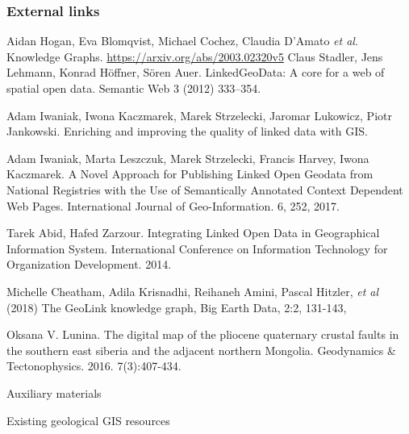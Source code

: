 \documentclass[10pt]{beamer}
\begin{document}
\begin{frame}
  \frametitle{External links}\footnotesize
  \begin{thebibliography}{99}
 Aidan Hogan, Eva Blomqvist, Michael Cochez, Claudia D’Amato \emph{et al}. Knowledge Graphs. \url{https://arxiv.org/abs/2003.02320v5}
 Claus Stadler, Jens Lehmann, Konrad Höffner, Sören Auer. LinkedGeoData: A core for a web of spatial open data. Semantic Web 3 (2012) 333–354. 

 Adam Iwaniak, Iwona Kaczmarek, Marek Strzelecki, Jaromar Lukowicz, Piotr Jankowski. Enriching and improving the quality of linked data with GIS. 

 Adam Iwaniak, Marta Leszczuk, Marek Strzelecki, Francis Harvey, Iwona Kaczmarek. A Novel Approach for Publishing Linked Open Geodata from National Registries with the Use of Semantically Annotated Context Dependent Web Pages. International Journal of Geo-Information. 6, 252, 2017. 

 Tarek Abid, Hafed Zarzour. Integrating Linked Open Data in Geographical
Information System. International Conference on Information Technology for Organization Development. 2014.

 Michelle Cheatham, Adila Krisnadhi, Reihaneh Amini, Pascal Hitzler, \emph{et al} (2018) The GeoLink knowledge graph, Big Earth Data, 2:2, 131-143, 

 Oksana V. Lunina.  The digital map of the pliocene quaternary crustal faults in the southern east siberia and the adjacent northern Mongolia. Geodynamics \& Tectonophysics. 2016. 7(3):407-434. 
\end{thebibliography}
\end{frame}

\begin{frame}
  \begin{center}
  \Large Auxiliary materials
\end{center}
\end{frame}


\begin{frame}\centering
  \Large Existing geological GIS resources
\end{frame}
\end{document}
